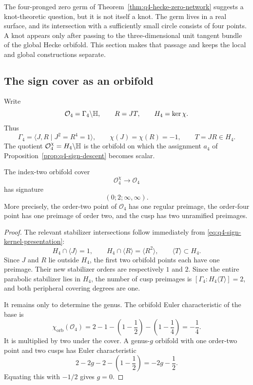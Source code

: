 The four-pronged zero germ of Theorem~\ref{thm:q4-hecke-zero-network}
suggests a knot-theoretic question, but it is not itself a knot.  The germ lives
in a real surface, and its intersection with a sufficiently small circle consists
of four points.  A knot appears only after passing to the three-dimensional unit
tangent bundle of the global Hecke orbifold.  This section makes that passage and
keeps the local and global constructions separate.

\subsection{The sign cover as an orbifold}

Write
\[
 \mathcal O_4=\Gamma_4\backslash\mathbb{H},
 \qquad
 R=JT,
 \qquad
 H_4=\ker\chi.
\]
Thus
\begin{equation}
 \Gamma_4=\langle J,R\mid J^2=R^4=1\rangle,
 \qquad
 \chi(J)=\chi(R)=-1,
 \qquad
 T=JR\in H_4.
 \label{eq:q4-sign-kernel-presentation}
\end{equation}
The quotient
\(\mathcal O_4^\chi=H_4\backslash\mathbb{H}\) is the orbifold on which the
assignment \(a_4\) of Proposition~\ref{prop:q4-sign-descent} becomes scalar.

\begin{proposition}
\label{prop:q4-sign-cover-signature}
The index-two orbifold cover
\[
 \mathcal O_4^\chi\longrightarrow\mathcal O_4
\]
has signature
\[
 (0;2;\infty,\infty).
\]
More precisely, the order-two point of \(\mathcal O_4\) has one regular
preimage, the order-four point has one preimage of order two, and the cusp has
two unramified preimages.
\end{proposition}

\begin{proof}
The relevant stabilizer intersections follow immediately from
\eqref{eq:q4-sign-kernel-presentation}:
\[
 H_4\cap\langle J\rangle=1,
 \qquad
 H_4\cap\langle R\rangle=\langle R^2\rangle,
 \qquad
 \langle T\rangle\subset H_4.
\]
Since \(J\) and \(R\) lie outside \(H_4\), the first two orbifold points each
have one preimage.  Their new stabilizer orders are respectively \(1\) and
\(2\).  Since the entire parabolic stabilizer lies in \(H_4\), the number of
cusp preimages is
\([\Gamma_4:H_4\langle T\rangle]=2\), and both peripheral covering degrees
are one.

It remains only to determine the genus.  The orbifold Euler characteristic of
the base is
\[
 \chi_{\mathrm{orb}}(\mathcal O_4)
 =2-1-\left(1-\frac12\right)-\left(1-\frac14\right)
 =-\frac14.
\]
It is multiplied by two under the cover.  A genus-\(g\) orbifold with one
order-two point and two cusps has Euler characteristic
\[
 2-2g-2-\left(1-\frac12\right)=-2g-\frac12.
\]
Equating this with \(-1/2\) gives \(g=0\).
\end{proof}

